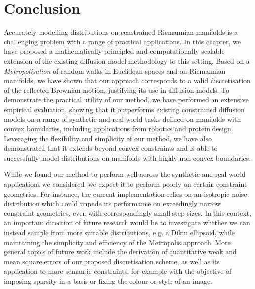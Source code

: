 \section{Conclusion}

Accurately modelling distributions on constrained Riemannian manifolds is a challenging problem with a range of practical applications.
In this chapter, we have proposed a mathematically principled and computationally scalable extension of the existing diffusion model methodology to this setting.
Based on a \emph{Metropolisation} of random walks in Euclidean spaces and on Riemannian manifolds, we have shown that our approach corresponds to a valid discretisation of the reflected Brownian motion, justifying its use in diffusion models.
To demonstrate the practical utility of our method, we have performed an extensive empirical evaluation, showing that it outperforms existing constrained diffusion models on a range of synthetic and real-world tasks defined on manifolds with convex boundaries, including applications from robotics and protein design.
Leveraging the flexibility and simplicity of our method, we have also demonstrated that it extends beyond convex constraints and is able to successfully model distributions on manifolds with highly non-convex boundaries.

While we found our method to perform well across the synthetic and real-world applications we considered, we expect it to perform poorly on certain constraint geometries.
For instance, the current implementation relies on an isotropic noise distribution which could impede its performance on exceedingly narrow constraint geometries, even with correspondingly small step sizes.
In this context, an important direction of future research would be to investigate whether we can instead sample from more suitable distributions, e.g. a Dikin ellipsoid, while maintaining the simplicity and efficiency of the Metropolis approach.
More general topics of future work include the derivation of quantitative weak and mean square errors of our proposed discretisation scheme, as well as its application to more semantic constraints, for example with the objective of imposing sparsity in a basis or fixing the colour or style of an image.

